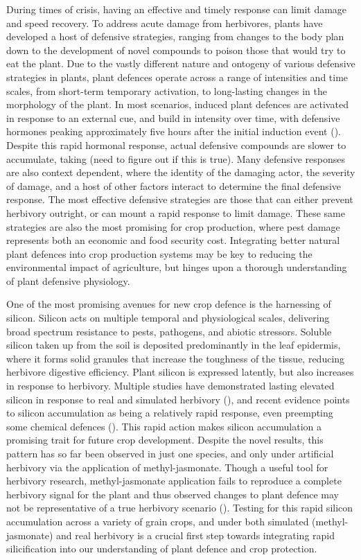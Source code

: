\documentclass[12pt, letterpaper, ]{article}
\begin{document}
During times of crisis, having an effective and timely response can limit damage and speed recovery. To address acute damage from herbivores, plants have developed a host of defensive strategies, ranging from changes to the body plan down to the development of novel compounds to poison those that would try to eat the plant. Due to the vastly different nature and ontogeny of various defensive strategies in plants, plant defences operate across a range of intensities and time scales, from short-term temporary activation, to long-lasting changes in the morphology of the plant. In most scenarios, induced plant defences are activated in response to an external cue, and build in intensity over time, with defensive hormones peaking approximately five hours after the initial induction event (\cite{schmelz_quantitative_2003}). Despite this rapid hormonal response, actual defensive compounds are slower to accumulate, taking (need to figure out if this is true). Many defensive responses are also context dependent, where the identity of the damaging actor, the severity of damage, and a host of other factors interact to determine the final defensive response. The most effective defensive strategies are those that can either prevent herbivory outright, or can mount a rapid response to limit damage. These same strategies are also the most promising for crop production, where pest damage represents both an economic and food security cost. Integrating better natural plant defences into crop production systems may be key to reducing the environmental impact of agriculture, but hinges upon a thorough understanding of plant defensive physiology.

One of the most promising avenues for new crop defence is the harnessing of silicon. Silicon acts on multiple temporal and physiological scales, delivering broad spectrum resistance to pests, pathogens, and abiotic stressors. Soluble silicon taken up from the soil is deposited predominantly in the leaf epidermis, where it forms solid granules that increase the toughness of the tissue, reducing herbivore digestive efficiency. Plant silicon is expressed latently, but also increases in response to herbivory. Multiple studies have demonstrated lasting elevated silicon in response to real and simulated herbivory (\cite{massey_are_2008,hartley_ecology_2016}), and recent evidence points to silicon accumulation as being a relatively rapid response, even preempting some chemical defences (\cite{waterman_short-term_2021}). This rapid action makes silicon accumulation a promising trait for future crop development. Despite the novel results, this pattern has so far been observed in just one species, and only under artificial herbivory via the application of methyl-jasmonate. Though a useful tool for herbivory research, methyl-jasmonate application fails to reproduce a complete herbivory signal for the plant and thus observed changes to plant defence may not be representative of a true herbivory scenario (\cite{strauss_direct_2002}). Testing for this rapid silicon accumulation across a variety of grain crops, and under both simulated (methyl-jasmonate) and real herbivory is a crucial first step towards integrating rapid silicification into our understanding of plant defence and crop protection.
\end{document}
